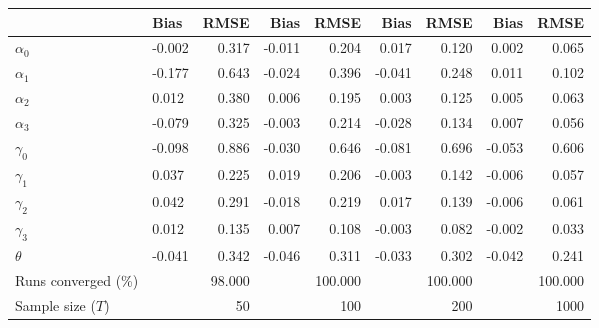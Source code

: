 
\begin{tabular}[t]{llrrrrrrr}
\toprule
  & Bias & RMSE & Bias & RMSE & Bias & RMSE & Bias & RMSE\\
\midrule
$\alpha_{0}$ & -0.002 & 0.317 & -0.011 & 0.204 & 0.017 & 0.120 & 0.002 & 0.065\\
$\alpha_{1}$ & -0.177 & 0.643 & -0.024 & 0.396 & -0.041 & 0.248 & 0.011 & 0.102\\
$\alpha_{2}$ & 0.012 & 0.380 & 0.006 & 0.195 & 0.003 & 0.125 & 0.005 & 0.063\\
$\alpha_{3}$ & -0.079 & 0.325 & -0.003 & 0.214 & -0.028 & 0.134 & 0.007 & 0.056\\
$\gamma_{0}$ & -0.098 & 0.886 & -0.030 & 0.646 & -0.081 & 0.696 & -0.053 & 0.606\\
$\gamma_{1}$ & 0.037 & 0.225 & 0.019 & 0.206 & -0.003 & 0.142 & -0.006 & 0.057\\
$\gamma_{2}$ & 0.042 & 0.291 & -0.018 & 0.219 & 0.017 & 0.139 & -0.006 & 0.061\\
$\gamma_{3}$ & 0.012 & 0.135 & 0.007 & 0.108 & -0.003 & 0.082 & -0.002 & 0.033\\
$\theta$ & -0.041 & 0.342 & -0.046 & 0.311 & -0.033 & 0.302 & -0.042 & 0.241\\
Runs converged (\%) &  & 98.000 &  & 100.000 &  & 100.000 &  & 100.000\\
Sample size ($T$) &  & 50 &  & 100 &  & 200 &  & 1000\\
\bottomrule
\end{tabular}
